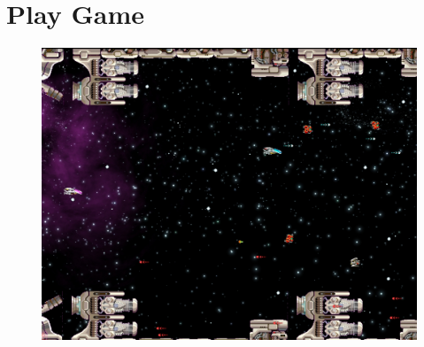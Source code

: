 \documentclass{koala-fr}
\begin{document}
\section{Play Game}

\begin{figure}[H]
      \begin{center}
        \includegraphics[width=15cm]{game.jpg}
      \end{center}
    \end{figure}
\end{document}
